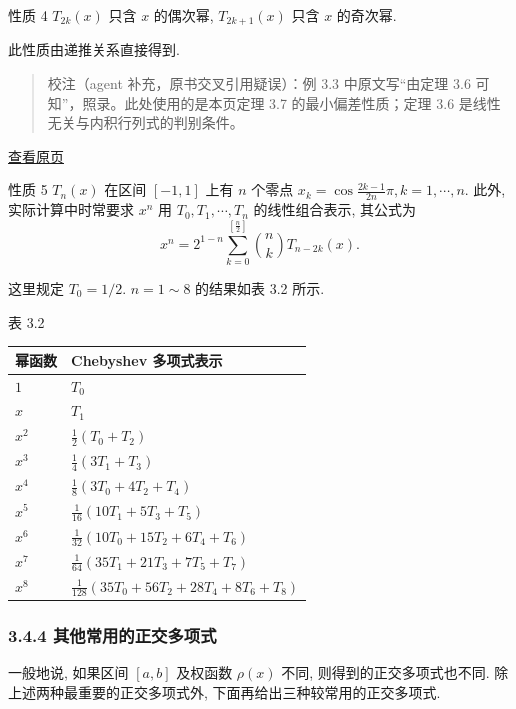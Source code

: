 \documentclass[
  10pt,
  fontset=fandol]{ctexart}
\newcounter{none} %
\begin{document}
性质 4 \(T_{2k}(x)\) 只含 \(x\) 的偶次幂, \(T_{2k+1}(x)\) 只含 \(x\) 的奇次幂.

此性质由递推关系直接得到.

\begin{quote}
校注（agent 补充，原书交叉引用疑误）：例 3.3 中原文写``由定理 3.6 可知''，照录。此处使用的是本页定理 3.7 的最小偏差性质；定理 3.6 是线性无关与内积行列式的判别条件。
\end{quote}

\href{../../source-images/pdf-075.jpeg}{查看原页}

性质 5 \(T_n(x)\) 在区间 \([-1,1]\) 上有 \(n\) 个零点 \(x_k = \cos \frac{2k-1}{2n}\pi, k=1, \cdots, n\). 此外, 实际计算中时常要求 \(x^n\) 用 \(T_0, T_1, \cdots, T_n\) 的线性组合表示, 其公式为 \[
x^n = 2^{1-n} \sum_{k=0}^{[\frac{n}{2}]} \binom{n}{k} T_{n-2k}(x). \tag{3.4.9}
\]

这里规定 \(T_0 = 1/2\). \(n=1 \sim 8\) 的结果如表 3.2 所示.

表 3.2

{\def\LTcaptype{none} %
\begin{longtable}[]{@{}ll@{}}
\toprule\noalign{}
幂函数 & Chebyshev 多项式表示 \\
\midrule\noalign{}
\endhead
\bottomrule\noalign{}
\endlastfoot
\(1\) & \(T_0\) \\
\(x\) & \(T_1\) \\
\(x^2\) & \(\frac12(T_0+T_2)\) \\
\(x^3\) & \(\frac14(3T_1+T_3)\) \\
\(x^4\) & \(\frac18(3T_0+4T_2+T_4)\) \\
\(x^5\) & \(\frac1{16}(10T_1+5T_3+T_5)\) \\
\(x^6\) & \(\frac1{32}(10T_0+15T_2+6T_4+T_6)\) \\
\(x^7\) & \(\frac1{64}(35T_1+21T_3+7T_5+T_7)\) \\
\(x^8\) & \(\frac1{128}(35T_0+56T_2+28T_4+8T_6+T_8)\) \\
\end{longtable}
}

\subsubsection{3.4.4 其他常用的正交多项式}\label{ux5176ux4ed6ux5e38ux7528ux7684ux6b63ux4ea4ux591aux9879ux5f0f}

一般地说, 如果区间 \([a,b]\) 及权函数 \(\rho(x)\) 不同, 则得到的正交多项式也不同. 除上述两种最重要的正交多项式外, 下面再给出三种较常用的正交多项式.
\end{document}

